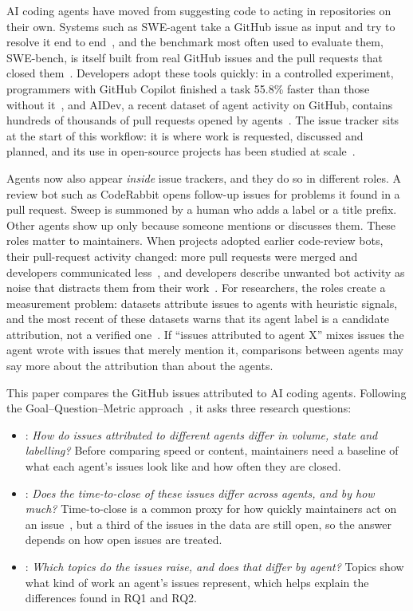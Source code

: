 AI coding agents have moved from suggesting code to acting in repositories on their own. Systems such as SWE-agent take a GitHub issue as input and try to resolve it end to end~\cite{yang2024sweagent}, and the benchmark most often used to evaluate them, SWE-bench, is itself built from real GitHub issues and the pull requests that closed them~\cite{jimenez2024swebench}. Developers adopt these tools quickly: in a controlled experiment, programmers with GitHub Copilot finished a task 55.8\% faster than those without it~\cite{peng2023copilot}, and AIDev, a recent dataset of agent activity on GitHub, contains hundreds of thousands of pull requests opened by agents~\cite{li2026aidev}. The issue tracker sits at the start of this workflow: it is where work is requested, discussed and planned, and its use in open-source projects has been studied at scale~\cite{bissyande2013issues}.

Agents now also appear \emph{inside} issue trackers, and they do so in different roles. A review bot such as CodeRabbit opens follow-up issues for problems it found in a pull request. Sweep is summoned by a human who adds a label or a title prefix. Other agents show up only because someone mentions or discusses them. These roles matter to maintainers. When projects adopted earlier code-review bots, their pull-request activity changed: more pull requests were merged and developers communicated less~\cite{wessel2020effects}, and developers describe unwanted bot activity as noise that distracts them from their work~\cite{wessel2021disturb}. For researchers, the roles create a measurement problem: datasets attribute issues to agents with heuristic signals, and the most recent of these datasets warns that its agent label is a candidate attribution, not a verified one~\cite{ghaleb2026codage}. If ``issues attributed to agent X'' mixes issues the agent wrote with issues that merely mention it, comparisons between agents may say more about the attribution than about the agents.

This paper compares the GitHub issues attributed to \NAgents{} AI coding agents. Following the Goal--Question--Metric approach~\cite{basili1994gqm}, it asks three research questions:
\begin{itemize}
\item {}: \emph{How do issues attributed to different agents differ in volume, state and labelling?} Before comparing speed or content, maintainers need a baseline of what each agent's issues look like and how often they are closed.
\item {}: \emph{Does the time-to-close of these issues differ across agents, and by how much?} Time-to-close is a common proxy for how quickly maintainers act on an issue~\cite{kikas2016lifetime}, but a third of the issues in the data are still open, so the answer depends on how open issues are treated.
\item {}: \emph{Which topics do the issues raise, and does that differ by agent?} Topics show what kind of work an agent's issues represent, which helps explain the differences found in RQ1 and RQ2.
\end{itemize}


